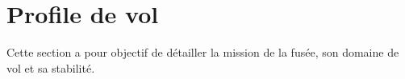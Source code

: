 \section{Profile de vol}
\label{sec:profile_vol}

Cette section a pour objectif de détailler la mission de la fusée, son domaine de vol et sa stabilité.





\newpage
